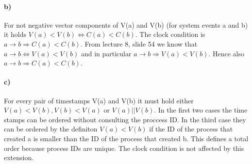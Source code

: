 \documentclass[12pt,a4paper]{article}
\begin{document}
		\paragraph{b)} For not negative vector components of V(a) and V(b) (for system events a and b) it holds $V(a)<V(b) \Leftrightarrow C(a)<C(b)$. The clock condition is $a \rightarrow b \Rightarrow C(a)<C(b)$. From lecture 8, slide 54 we know that $a \rightarrow b \Leftrightarrow V(a)<V(b)$ and in particular  $a \rightarrow b \Rightarrow V(a)<V(b)$. Hence also $a \rightarrow b \Rightarrow C(a)<C(b)$.
		\paragraph{c)} For every pair of timestamps V(a) and V(b) it must hold either $V(a)<V(b), V(b)<V(a)$ or $V(a)||V(b)$. In the first two cases the time stamps can be ordered without consulting the proccess ID. In the third case they can be ordered by the definiton $V(a)<V(b)$ if the ID of the process that created a is smaller than the ID of the process that created b. This defines a total order because process IDs are unique. The clock condition is not affected by this extension.
\end{document}
